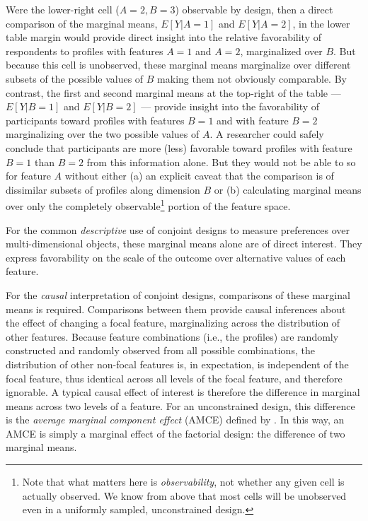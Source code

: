 \documentclass[a4paper,12pt]{article}\usepackage[]{graphicx}\usepackage[]{color}
\begin{document}
\noindent Were the lower-right cell ($A=2, B=3$) observable by design, then a direct comparison of the marginal means, $E[Y|A=1]$ and $E[Y|A=2]$, in the lower table margin would provide direct insight into the relative favorability of respondents to profiles with features $A=1$ and $A=2$, marginalized over $B$. But because this cell is unobserved, these marginal means marginalize over different subsets of the possible values of $B$ making them not obviously comparable. By contrast, the first and second marginal means at the top-right of the table --- $E[Y|B=1]$ and $E[Y|B=2]$ --- provide insight into the favorability of participants toward profiles with features $B=1$ and with feature $B=2$ marginalizing over the two possible values of $A$. A researcher could safely conclude that participants are more (less) favorable toward profiles with feature $B=1$ than $B=2$ from this information alone. But they would not be able to so for feature $A$ without either (a) an explicit caveat that the comparison is of dissimilar subsets of profiles along dimension $B$ or (b) calculating marginal means over only the completely observable\footnote{Note that what matters here is \textit{observability}, not whether any given cell is actually observed. We know from above that most cells will be unobserved even in a uniformly sampled, unconstrained design.} portion of the feature space.

For the common \textit{descriptive} use of conjoint designs to measure preferences over multi-dimensional objects, these marginal means alone are of direct interest. They express favorability on the scale of the outcome over alternative values of each feature.

For the \textit{causal} interpretation of conjoint designs, comparisons of these marginal means is required. Comparisons between them provide causal inferences about the effect of changing a focal feature, marginalizing across the distribution of other features. Because feature combinations (i.e., the profiles) are randomly constructed and randomly observed from all possible combinations, the distribution of other non-focal features is, in expectation, is independent of the focal feature, thus identical across all levels of the focal feature, and therefore ignorable. A typical causal effect of interest is therefore the difference in marginal means across two levels of a feature. For an unconstrained design, this difference is the \textit{average marginal component effect} (AMCE) defined by \citet{HainmuellerHopkinsYamamoto2014}. In this way, an AMCE is simply a marginal effect of the factorial design: the difference of two marginal means.
\end{document}
